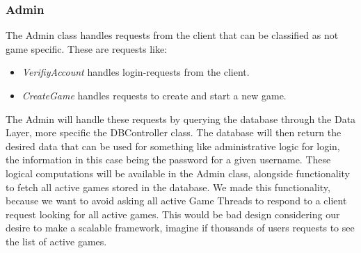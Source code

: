 \subsubsection{Admin}
\label{sec:adminimpl}
The Admin class handles requests from the client that can be classified as not game specific. These are requests like:
\begin{itemize}
\item \textit{VerifiyAccount} handles login-requests from the client.
\item \textit{CreateGame} handles requests to create and start a new game.
\end{itemize}

The Admin will handle these requests by querying the database through the Data Layer, more specific the DBController class. The database will then return the desired data that can be used for something like administrative logic for login, the information in this case being the password for a given username. These logical computations will be available in the Admin class, alongside functionality to fetch all active games stored in the database. We made this functionality, because we want to avoid asking all active Game Threads to respond to a client request looking for all active games. This would be bad design considering our desire to make a scalable framework, imagine if thousands of users requests to see the list of active games. 




